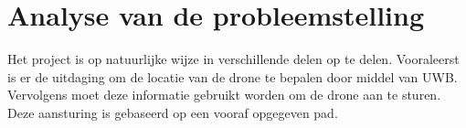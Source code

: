 \chapter{Analyse van de probleemstelling}
Het project is op natuurlijke wijze in verschillende delen op te delen. Vooraleerst is er de uitdaging om de locatie van de drone te bepalen door middel van UWB. Vervolgens moet deze informatie gebruikt worden om de drone aan te sturen. Deze aansturing is gebaseerd op een vooraf opgegeven pad.
